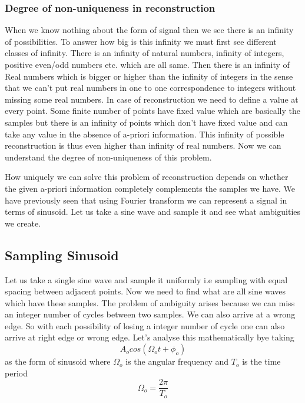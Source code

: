 \subsubsection{Degree of non-uniqueness in reconstruction}

When we know nothing about the form of signal then we see there is an infinity of possibilities. To answer how big is this infinity we must first see different classes of infinity. There is an infinity of natural numbers, infinity of integers, positive even/odd numbers etc. which are all same. Then there is an infinity of Real numbers which is bigger or higher than the infinity of integers in the sense that we can't put real numbers in one to one correspondence to integers without missing some real numbers. In case of reconstruction we need to define a value at every point. Some finite number of points have fixed value which are basically the samples but there is an infinity of points which don't have fixed value and can take any value in the absence of a-priori information. This infinity of possible reconstruction is thus even higher than infinity of real numbers. Now we can understand the degree of non-uniqueness of this problem.

How uniquely we can solve this problem of reconstruction depends on whether the given a-priori information completely complements the samples we have. We have previously seen that using Fourier transform we can represent a signal in terms of sinusoid. Let us take a sine wave and sample it and see what ambiguities we create. 

\subsection{Sampling Sinusoid}
Let us take a single sine wave and sample it uniformly i.e sampling with equal spacing between adjacent points. Now we need to find what are all sine waves which have these samples. The problem of ambiguity arises because we can miss an integer number of cycles between two samples. We can also arrive at a wrong edge. So with each possibility of losing a integer number of cycle one can also arrive at right edge or wrong edge. Let's analyse this mathematically bye taking $$A_{o}cos(\Omega _{o}t+\phi _{o})$$ as the form of sinusoid where $\Omega _{o}$ is the angular frequency and $T_{o}$ is the time period $$\Omega _{o}=\frac{2\pi }{T_{o}}$$ 


